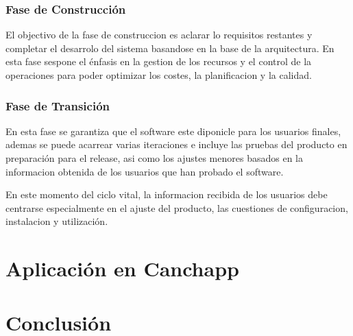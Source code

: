 \documentclass[spanish]{udpreport}
\begin{document}
\subsection{Fase de Construcción}
\label{subsec:construccion}
El objectivo de la fase de construccion es aclarar lo requisitos restantes y completar el desarrolo del sistema basandose en la base de la arquitectura.
En esta fase sespone el énfasis en la gestion de los recursos y el control de la operaciones para poder optimizar los costes, la planificacion y la calidad.\par

\subsection{Fase de Transición}
En esta fase se garantiza que el software este diponicle para los usuarios finales, ademas se puede acarrear varias iteraciones e incluye las pruebas del producto en preparación para el release, asi como los ajustes menores basados en la informacion obtenida de los usuarios que han probado el software.\par
En este momento del ciclo vital, la informacion recibida de los usuarios debe centrarse especialmente en el ajuste del producto, las cuestiones de configuracion, instalacion y utilización.

\chapter{Aplicación en Canchapp}

\chapter{Conclusión}


\end{document}

